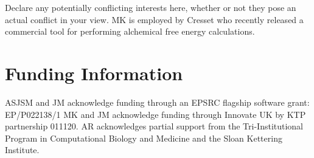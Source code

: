 \documentclass[9pt,bestpractices]{livecoms}
\begin{document}
Declare any potentially conflicting interests here, whether or not they pose an actual conflict in your view.
MK is employed by Cresset who recently released a commercial tool for performing alchemical free energy calculations.

\section*{Funding Information}
ASJSM and JM acknowledge funding through an EPSRC flagship software grant: EP/P022138/1
MK and JM acknowledge funding through Innovate UK by KTP partnership 011120.
AR acknowledges partial support from the Tri-Institutional Program in Computational Biology and Medicine and the Sloan Kettering Institute.




\end{document}
